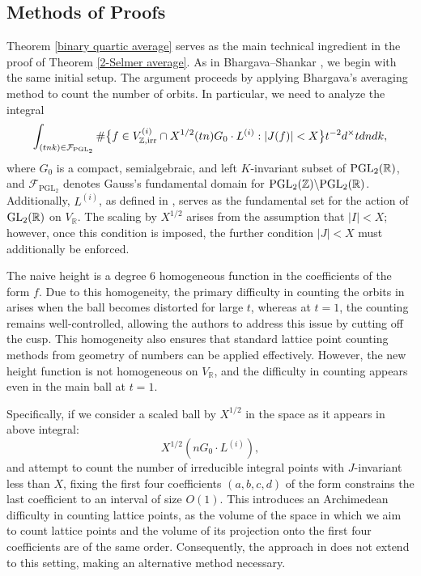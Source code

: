 \documentclass{article}
\def\Z{{\mathbb Z}}
\def\GL{{\rm GL}}
\def\PGL{{\rm PGL}}
\def\irr{{\rm irr}}
\def\R{{\mathbb R}}
\def\Z{{\mathbb Z}}
\begin{document}
\subsection{Methods of Proofs}
Theorem \ref{binary quartic average} serves as the main technical ingredient in the proof of Theorem \ref{2-Selmer average}. As in Bhargava--Shankar \cite{main}, we begin with the same initial setup. The argument proceeds by applying Bhargava’s averaging method to count the number of orbits. In particular, we need to analyze the integral
\begin{equation}\label{TheIntegral}
    \int_{(tnk)\in \mathcal{F}_{\text{PGL}_2}} \#\big\{f \in V_{\Z,\irr}^{(i)} \cap X^{1/2}(tn)G_0 \cdot L^{(i)} : |J(f)| < X \big\} t^{-2} d^{\times}t  dndk,
\end{equation}
where $G_0$ is a compact, semialgebraic, and left $K$-invariant subset of $\PGL_2(\R)$, and $\mathcal{F}_{\text{PGL}_2}$ denotes Gauss’s fundamental domain for $\PGL_2(\Z) \backslash \PGL_2(\R)$. Additionally, $L^{(i)}$, as defined in \cite{main}, serves as the fundamental set for the action of $\GL_2(\R)$ on $V_{\R}$. The scaling by $X^{1/2}$ arises from the assumption that $|I| < X$; however, once this condition is imposed, the further condition $|J| < X$ must additionally be enforced.




The naive height is a degree 6 homogeneous function in the coefficients of the form $f$. Due to this homogeneity, the primary difficulty in counting the orbits in \cite{main} arises when the ball becomes distorted for large $t$, whereas at $t = 1$, the counting remains well-controlled, allowing the authors to address this issue by cutting off the cusp. This homogeneity also ensures that standard lattice point counting methods from geometry of numbers can be applied effectively. However, the new height function is not homogeneous on $V_{\R}$, and the difficulty in counting appears even in the main ball at $t = 1$. 

Specifically, if we consider a scaled ball by $X^{1/2}$ in the space as it appears in above integral:
\begin{equation*}
     X^{1/2}(nG_0\cdot L^{(i)}),
\end{equation*}
and attempt to count the number of irreducible integral points with $J$-invariant less than $X$, fixing the first four coefficients $(a, b, c, d)$ of the form constrains the last coefficient to an interval of size $O(1)$. This introduces an Archimedean difficulty in counting lattice points, as the volume of the space in which we aim to count lattice points and the volume of its projection onto the first four coefficients are of the same order. Consequently, the approach in \cite{main} does not extend to this setting, making an alternative method necessary.
\end{document}
